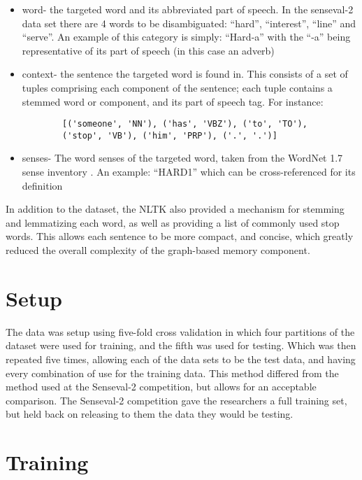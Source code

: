 \begin{itemize}     
	\item word- the targeted word and its abbreviated part of speech. In the 
	senseval-2 data set there are 4 words to be disambiguated: ``hard'', 
	``interest'', ``line'' and ``serve''. An example of this category is simply:
	``Hard-a'' with the ``-a'' being representative of its part of speech (in 
	this case an adverb)
	\item context- the sentence the targeted word is found in. This consists of 
	a set of tuples comprising each component of the sentence; each tuple 
	contains a stemmed word or component, and its part of speech tag. For 
	instance: 
	\begin{verbatim}
		[('someone', 'NN'), ('has', 'VBZ'), ('to', 'TO'), 
		('stop', 'VB'), ('him', 'PRP'), ('.', '.')] 
	\end{verbatim}

	\item senses- The word senses of the targeted word, taken from the WordNet 
	1.7 sense inventory . An example: ``HARD1'' which can be cross-referenced 
	for its definition 
\end{itemize}

In addition to the dataset, the NLTK also provided a mechanism for stemming and
lemmatizing each word, as well as providing a list of commonly used stop words.
This allows each sentence to be more compact, and concise, which greatly reduced
the overall complexity of the graph-based memory component.

\section{Setup}

The data was setup using five-fold cross validation in which four partitions of
the dataset were used for training, and the fifth was used for testing. Which
was then repeated five times, allowing each of the data sets to be the test
data, and having every combination of use for the training data.  This method
differed from the method used at the Senseval-2 competition, but allows for an
acceptable comparison.  The Senseval-2 competition gave the researchers a full
training set, but held back on releasing to them the data they would be testing.

\section{Training}


